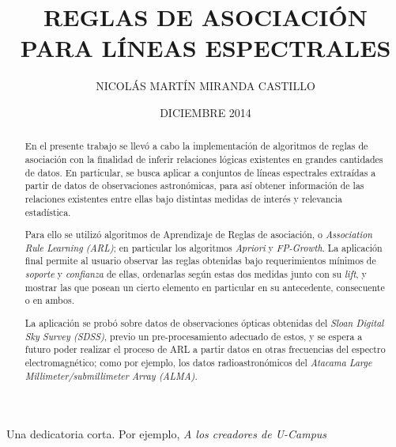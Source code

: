 \documentclass[upright, contnum]{umemoria}
\author{NICOL\'AS MART\'IN MIRANDA CASTILLO}
\title{REGLAS DE ASOCIACI\'ON PARA L\'INEAS ESPECTRALES}
\date{DICIEMBRE 2014}
\begin{document}
\frontmatter
\maketitle

\begin{abstract}
En el presente trabajo se llevó a cabo la implementación de algoritmos de reglas de asociación con la finalidad de inferir relaciones lógicas existentes en grandes cantidades de datos. En particular, se busca aplicar a conjuntos de líneas espectrales extraídas a partir de datos de observaciones astronómicas, para así obtener información de las relaciones existentes entre ellas bajo distintas medidas de interés y relevancia estadística.

Para ello se utilizó algoritmos de Aprendizaje de Reglas de asociación, o \textit{Association Rule Learning (ARL)}; en particular los algoritmos \textit{Apriori} y \textit{FP-Growth}. La aplicación final permite al usuario observar las reglas obtenidas bajo requerimientos mínimos de \textit{soporte} y \textit{confianza} de ellas, ordenarlas según estas dos medidas junto con su \textit{lift}, y mostrar las que posean un cierto elemento en particular en su antecedente, consecuente o en ambos.

La aplicación se probó sobre datos de observaciones ópticas obtenidas del \textit{Sloan Digital Sky Survey (SDSS)}, previo un pre-procesamiento adecuado de estos, y se espera a futuro poder realizar el proceso de ARL a partir datos en otras frecuencias del espectro electromagnético; como por ejemplo, los datos radioastronómicos del \textit{Atacama Large Millimeter/submillimeter Array (ALMA)}.
\end{abstract}

\begin{dedicatoria}
Una dedicatoria corta. Por ejemplo, \emph{A los creadores de U-Campus}
\end{dedicatoria}

\begin{thanks}
\lipsum[1-2]
\end{thanks}

\cleardoublepage
\begin{spacing}{1}
\tableofcontents
\listoffigures
\end{spacing}

\mainmatter








\nocite{*}


\end{document}
